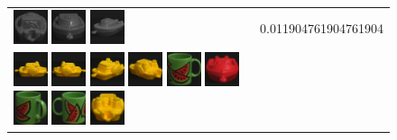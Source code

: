 {\begin{figure}[p]
\begin{tabular}{m{11cm} | m{3cm} |}
\includegraphics[width=1cm]{coil/beeld-26.eps}
\includegraphics[width=1cm]{coil/beeld-28.eps}
\includegraphics[width=1cm]{coil/beeld-29.eps}
& {\scriptsize 0.011904761904761904}
\\
\includegraphics[width=1cm]{coil/beeld-12.eps}
\includegraphics[width=1cm]{coil/beeld-13.eps}
\includegraphics[width=1cm]{coil/beeld-15.eps}
\includegraphics[width=1cm]{coil/beeld-16.eps}
\includegraphics[width=1cm]{coil/beeld-30.eps}
\includegraphics[width=1cm]{coil/beeld-20.eps}
\includegraphics[width=1cm]{coil/beeld-34.eps}
\includegraphics[width=1cm]{coil/beeld-31.eps}
\includegraphics[width=1cm]{coil/beeld-17.eps}

\end{tabular}
\end{figure}}
